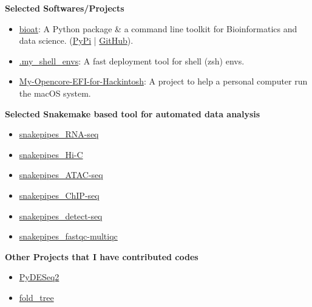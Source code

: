 \textbf{Selected Softwares/Projects}
\begin{itemize}
    \item \href{https://github.com/hermanzhaozzzz/bioat}{bioat}: A Python package \& a command line toolkit for Bioinformatics and data science. (\href{https://pypi.org/project/bioat/}{PyPi} | \href{https://github.com/hermanzhaozzzz/bioat}{GitHub}).
    \item \href{https://github.com/hermanzhaozzzz/.my_shell_envs}{.my\_shell\_envs}: A fast deployment tool for shell (zsh) envs.
    \item \href{https://github.com/hermanzhaozzzz/My-Opencore-EFI-for-AMD3900X-5700XT-TUF-x570-Hackintosh}{My-Opencore-EFI-for-Hackintosh}: A project to help a personal computer run the macOS system.
\end{itemize}

\textbf{Selected Snakemake based tool for automated data analysis}
\begin{itemize}
    \item \href{https://github.com/hermanzhaozzzz/snakepipes_RNA-seq}{snakepipes\_RNA-seq}
    \item \href{https://github.com/hermanzhaozzzz/snakepipes_Hi-C}{snakepipes\_Hi-C}
    \item \href{https://github.com/hermanzhaozzzz/snakepipes_ATAC-seq}{snakepipes\_ATAC-seq}
    \item \href{https://github.com/hermanzhaozzzz/snakepipes_ChIP-seq}{snakepipes\_ChIP-seq}
    \item \href{https://github.com/hermanzhaozzzz/snakepipes_detect-seq}{snakepipes\_detect-seq}
    \item \href{https://github.com/hermanzhaozzzz/snakepipes_fastqc-multiqc}{snakepipes\_fastqc-multiqc}
\end{itemize}


\textbf{Other Projects that I have contributed codes}
\begin{itemize}
    \item \href{https://github.com/owkin/PyDESeq2}{PyDESeq2}
    \item \href{https://github.com/DessimozLab/fold_tree}{fold\_tree}
\end{itemize}

